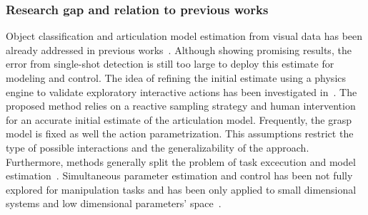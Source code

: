 \subsubsection{Research gap and relation to previous works}
Object classification and articulation model estimation from visual data has been already addressed in previous works~\cite{he2017mask, li2020category}. Although showing promising results, the error from single-shot detection is still too large to deploy this estimate for modeling and control. The idea of refining the initial estimate using a physics engine to validate exploratory interactive actions has been investigated in~\cite{eppner2018physics}. The proposed method relies on a reactive sampling strategy and human intervention for an accurate initial estimate of the articulation model. Frequently, the grasp model is fixed as well the action parametrization. This assumptions restrict the type of possible interactions and the generalizability of the approach. Furthermore, methods generally split the problem of task excecution and model estimation~\cite{eppner2018physics}. Simultaneous parameter estimation and control has been not fully explored for manipulation tasks and has been only applied to small dimensional systems and low dimensional parameters' space~\cite{barcelos2021dual}. 